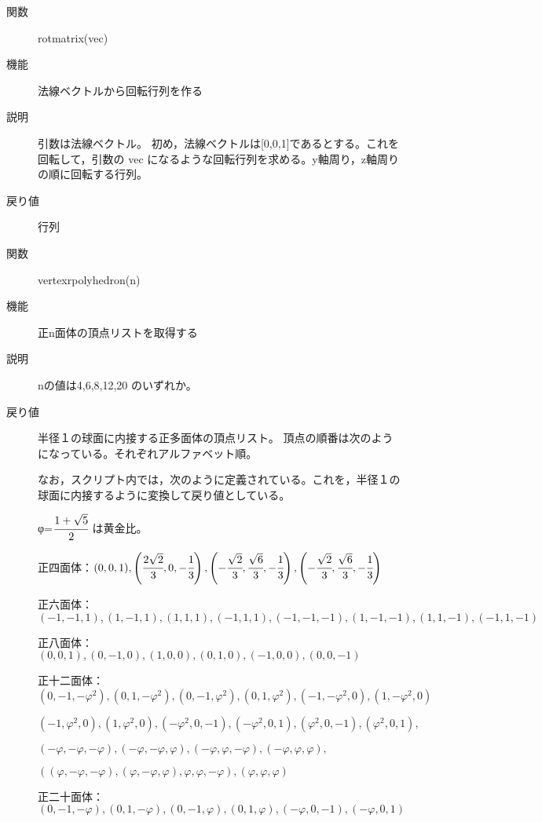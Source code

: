 \documentclass[papersize,a4paper,12pt,uplatex]{jsarticle}
\begin{document}
\begin{description}
\vspace{\baselineskip}
\hypertarget{rotmatrix}{}
\item[関数] rotmatrix(vec)
\item[機能] 法線ベクトルから回転行列を作る
\item[説明] 引数は法線ベクトル。 初め，法線ベクトルは[0,0,1]であるとする。これを回転して，引数の vec になるような回転行列を求める。y軸周り，z軸周りの順に回転する行列。 
\item[戻り値] 行列

\vspace{\baselineskip}

\hypertarget{vertexrpolyhedron}{}
\item[関数] vertexrpolyhedron(n)
\item[機能] 正n面体の頂点リストを取得する
\item[説明] nの値は4,6,8,12,20 のいずれか。
\item[戻り値] 半径１の球面に内接する正多面体の頂点リスト。
頂点の順番は次のようになっている。それぞれアルファベット順。

    
    
 

なお，スクリプト内では，次のように定義されている。これを，半径１の球面に内接するように変換して戻り値としている。

φ=$\cfrac{1+\sqrt{5}}{2}$ は黄金比。 

正四面体：$(0,0,1),\left(\cfrac{2\sqrt{2}}{3},0,-\cfrac{1}{3} \right),\left(-\cfrac{\sqrt{2}}{3},\cfrac{\sqrt{6}}{3},-\cfrac{1}{3} \right),\left(-\cfrac{\sqrt{2}}{3},\cfrac{\sqrt{6}}{3},-\cfrac{1}{3}\right)$ 

正六面体：$(-1,-1,1),(1,-1,1),(1,1,1),(-1,1,1),(-1,-1,-1),(1,-1,-1),(1,1,-1),(-1,1,-1)$ 

正八面体：$(0,0,1),(0,-1,0),(1,0,0),(0,1,0),(-1,0,0),(0,0,-1)$ 

正十二面体：$(0,-1,-φ^2),(0,1,-φ^2),(0,-1,φ^2),(0,1,φ^2),(-1,-φ^2,0),(1,-φ^2,0) $

\hspace{15mm}$  (-1,φ^2,0),(1,φ^2,0),(-φ^2,0,-1),(-φ^2,0,1),(φ^2,0,-1),(φ^2,0,1), $
    
\hspace{15mm}     $ (-φ,-φ,-φ),(-φ,-φ,φ),(-φ,φ,-φ),(-φ,φ,φ), $

\hspace{15mm}     $((φ,-φ,-φ),(φ,-φ,φ),φ,φ,-φ),(φ,φ,φ)$ 

正二十面体：$(0,-1,-φ),(0,1,-φ),(0,-1,φ),(0,1,φ),(-φ,0,-1),(-φ,0,1) $


\end{description}
\end{document}
